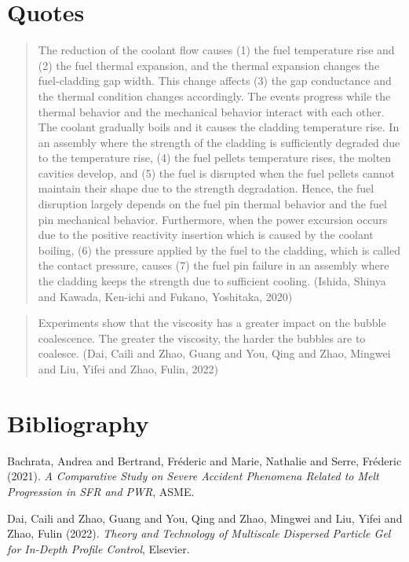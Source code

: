 \documentclass[11pt]{article}
\begin{document}
\section{Quotes}
\label{sec:org231f729}
\begin{quote}
The reduction of the coolant flow causes (1) the fuel temperature rise and (2) the fuel thermal expansion, and the thermal expansion changes the fuel-cladding gap width. This change affects (3) the gap conductance and the thermal condition changes accordingly. The events progress while the thermal behavior and the mechanical behavior interact with each other. The coolant gradually boils and it causes the cladding temperature rise. In an assembly where the strength of the cladding is sufficiently degraded due to the temperature rise, (4) the fuel pellets temperature rises, the molten cavities develop, and (5) the fuel is disrupted when the fuel pellets cannot maintain their shape due to the strength degradation. Hence, the fuel disruption largely depends on the fuel pin thermal behavior and the fuel pin mechanical behavior. Furthermore, when the power excursion occurs due to the positive reactivity insertion which is caused by the coolant boiling, (6) the pressure applied by the fuel to the cladding, which is called the contact pressure, causes (7) the fuel pin failure in an assembly where the cladding keeps the strength due to sufficient cooling. (Ishida, Shinya and Kawada, Ken-ichi and Fukano, Yoshitaka, 2020)
\end{quote}
\begin{quote}
Experiments show that the viscosity has a greater impact on the bubble coalescence. The greater the viscosity, the harder the bubbles are to coalesce. (Dai, Caili and Zhao, Guang and You, Qing and Zhao, Mingwei and Liu, Yifei and Zhao, Fulin, 2022)
\end{quote}
\cite{afflardBubbleDetectionLiquid2023}
\section{Bibliography}
\label{sec:org9104dee}
\noindent
Bachrata, Andrea and Bertrand, Fr{\'e}deric and Marie, Nathalie and Serre, Fr{\'e}deric (2021). \emph{A Comparative Study on Severe Accident Phenomena Related to Melt Progression in {{SFR}} and {{PWR}}}, ASME.

\noindent
Dai, Caili and Zhao, Guang and You, Qing and Zhao, Mingwei and Liu, Yifei and Zhao, Fulin (2022). \emph{Theory and Technology of Multiscale Dispersed Particle Gel for In-Depth Profile Control}, Elsevier.
\end{document}
